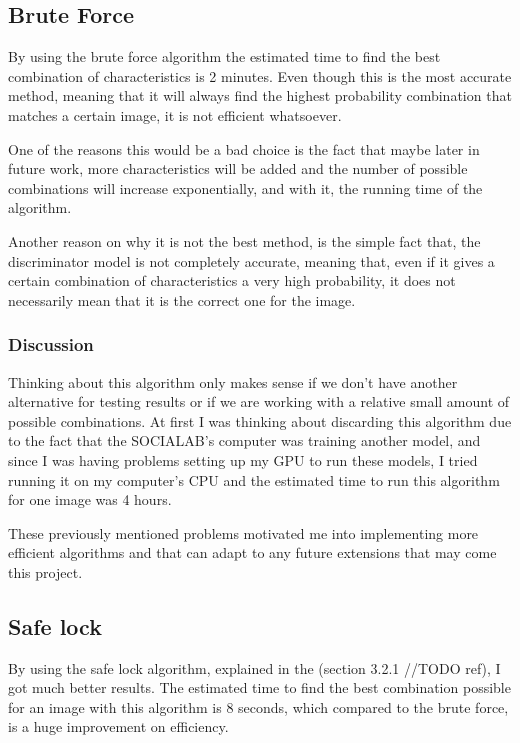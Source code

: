 \documentclass[12pt,a4paper,oneside]{memoir}
\begin{document}
\subsection{Brute Force}
\label{sub:brute}
By using the brute force algorithm the estimated time to find the best combination of characteristics is 2 minutes. Even though this is the most accurate method, meaning that it will always find the highest probability combination that matches a certain image, it is not efficient whatsoever.


\par

One of the reasons this would be a bad choice is the fact that maybe later in future work, more characteristics will be added and the number of possible combinations will increase exponentially, and with it, the running time of the algorithm. 

Another reason on why it is not the best method, is the simple fact that, the discriminator model is not completely accurate, meaning that, even if it gives a certain combination of characteristics a very high probability, it does not necessarily mean that it is the correct one for the image.


\subsubsection{Discussion}
Thinking about this algorithm only makes sense if we don't have another alternative for testing results or if we are working with a relative small amount of possible combinations. At first I was thinking about discarding this algorithm due to the fact that the SOCIALAB's computer was training another model, and since I was having problems setting up my GPU to run these models, I tried running it on my computer's \acs{CPU} and the estimated time to run this algorithm for one image was 4 hours.

\par

These previously mentioned problems motivated me into implementing more efficient algorithms and that can adapt to any future extensions that may come this project.


\subsection{Safe lock}
\label{sub:safe}
By using the safe lock algorithm, explained in the (section 3.2.1 //TODO ref), I got much better results. The estimated time to find the best combination possible for an image with this algorithm is 8 seconds, which compared to the brute force, is a huge improvement on efficiency. 
\end{document}
